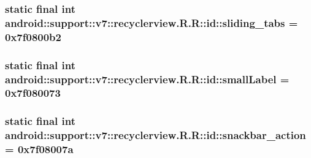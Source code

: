 \hypertarget{classandroid_1_1support_1_1v7_1_1recyclerview_1_1_r_1_1id_af9d98b62f8e0bc47f3c8d99e304329e}{
\subsubsection[{sliding\_\-tabs}]{\setlength{\rightskip}{0pt plus 5cm}static final int android::support::v7::recyclerview.R.R::id::sliding\_\-tabs = 0x7f0800b2}}
\label{classandroid_1_1support_1_1v7_1_1recyclerview_1_1_r_1_1id_af9d98b62f8e0bc47f3c8d99e304329e}


\hypertarget{classandroid_1_1support_1_1v7_1_1recyclerview_1_1_r_1_1id_5b68944cbbbb99897b27204bfdae8312}{
\subsubsection[{smallLabel}]{\setlength{\rightskip}{0pt plus 5cm}static final int android::support::v7::recyclerview.R.R::id::smallLabel = 0x7f080073}}
\label{classandroid_1_1support_1_1v7_1_1recyclerview_1_1_r_1_1id_5b68944cbbbb99897b27204bfdae8312}


\hypertarget{classandroid_1_1support_1_1v7_1_1recyclerview_1_1_r_1_1id_1795eacf7b79166ea8f7920e7458a59d}{
\subsubsection[{snackbar\_\-action}]{\setlength{\rightskip}{0pt plus 5cm}static final int android::support::v7::recyclerview.R.R::id::snackbar\_\-action = 0x7f08007a}}
\label{classandroid_1_1support_1_1v7_1_1recyclerview_1_1_r_1_1id_1795eacf7b79166ea8f7920e7458a59d}


